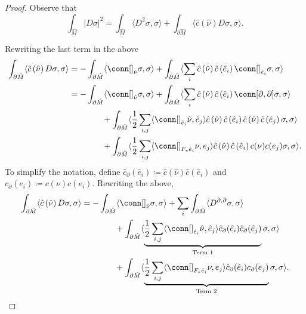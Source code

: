 \documentclass[12pt, reqno]{amsart}
\theoremstyle{plain} %
\theoremstyle{definition}
\theoremstyle{remark}
\numberwithin{equation}{section}
\newcommand{\dom}[1]{\hat{#1}}
\newcommand{\pnorm}[1]{| #1 |}
\newcommand{\bnd}[1]{\partial #1}
\newcommand{\cbar}[1]{\dom{c}\left(#1\right)}
\newcommand{\inner}[1]{\langle #1 \rangle}
\begin{document}
\begin{proof}
    Observe that
    \begin{equation*}
        \int_{\dom{M}} \pnorm{D \sigma}^2 = \int_{\dom{M}} \inner{D^2 \sigma, \sigma} + \int_{\bnd{\dom{M}}} \inner{\cbar{\dom{\nu}} D \sigma, \sigma}.
    \end{equation*}

    Rewriting the last term in the above
    \begin{align*}
        \int_{\bnd{\dom{M}}} \inner{\cbar{\dom{\nu}} D \sigma, \sigma} &= -\int_{\bnd{\dom{M}}} \inner{\conn[]_{\dom{\nu}} \sigma, \sigma} + \int_{\bnd{\dom{M}}} \inner{\sum_i \cbar{\dom{\nu}} \cbar{\dom{e}_i} \conn[]_{\dom{e}_i} \sigma, \sigma}\\
        &= -\int_{\bnd{\dom{M}}} \inner{\conn[]_{\dom{\nu}} \sigma, \sigma} + \int_{\bnd{\dom{M}}} \inner{\sum_i \cbar{\dom{\nu}} \cbar{\dom{e}_i} \conn[\partial, \partial] \sigma, \sigma}\\
        &\qquad\qquad + \int_{\bnd{\dom{M}}} \inner{\frac{1}{2} \sum_{i, j} \inner{\conn[]_{\dom{e}_i} \dom{\nu}, \dom{e}_j} \cbar{\dom{\nu}} \cbar{\dom{e}_i} \cbar{\dom{\nu}} \cbar{\dom{e}_j} \sigma, \sigma}\\
        &\qquad\qquad + \int_{\bnd{\dom{M}}} \inner{\frac{1}{2} \sum_{i, j} \inner{\conn[]_{F_*\dom{e}_i} \nu, e_j} \cbar{\dom{\nu}} \cbar{\dom{e}_i} c(\nu) c(e_j) \sigma, \sigma}.
    \end{align*}
    To simplify the notation, define \(\dom{c}_\partial(\dom{e}_i) \coloneqq \dom{c}(\dom{\nu}) \dom{c}(\dom{e}_i)\) and \(c_\partial(e_i) \coloneqq c(\nu) c(e_i)\).
    Rewriting the above,
    \begin{equation}\label{eqn:boundary dirac operator term}
        \begin{split}
            \int_{\bnd{\dom{M}}} \inner{\cbar{\dom{\nu}} D \sigma, \sigma} &= -\int_{\bnd{\dom{M}}} \inner{\conn[]_{\dom{\nu}} \sigma, \sigma} + \sum_i \int_{\bnd{\dom{M}}} \inner{D^{\partial, \partial} \sigma, \sigma}\\
            &\qquad\qquad + \int_{\bnd{\dom{M}}} \inner{\underbrace{\frac{1}{2} \sum_{i, j} \inner{\conn[]_{\dom{e}_i} \dom{\nu}, \dom{e}_j} \dom{c}_\partial(\dom{e}_i) \dom{c}_\partial(\dom{e}_j)}_{\text{Term 1}}\sigma , \sigma}\\
            &\qquad\qquad + \int_{\bnd{\dom{M}}} \inner{\underbrace{\frac{1}{2} \sum_{i, j} \inner{\conn[]_{F_*\dom{e}_i} \nu, e_j} \dom{c}_\partial(\dom{e}_i) c_\partial(e_j)}_{\text{Term 2}}\sigma , \sigma}.
        \end{split}
    \end{equation}


\end{proof}
\end{document}
